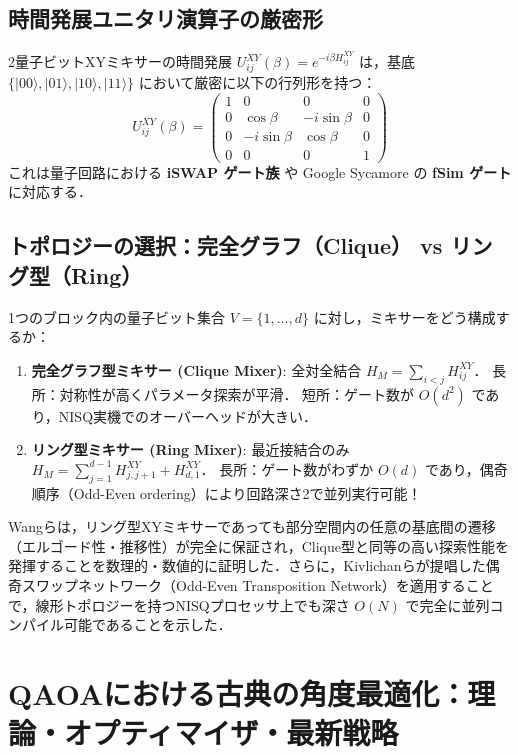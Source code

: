\documentclass[11pt,a4paper,oneside,openany]{ltjsbook}
\theoremstyle{definition}
\theoremstyle{plain}
\theoremstyle{remark}
\newcommand{\ket}[1]{|#1\rangle}
\begin{document}
\section{時間発展ユニタリ演算子の厳密形}
2量子ビットXYミキサーの時間発展 $U_{ij}^{XY}(\beta) = e^{-i \beta H_{ij}^{XY}}$ は，基底 $\{\ket{00}, \ket{01}, \ket{10}, \ket{11}\}$ において厳密に以下の行列形を持つ：
\begin{equation}
    U_{ij}^{XY}(\beta) = \begin{pmatrix}
        1 & 0 & 0 & 0 \\
        0 & \cos\beta & -i\sin\beta & 0 \\
        0 & -i\sin\beta & \cos\beta & 0 \\
        0 & 0 & 0 & 1
    \end{pmatrix}
\end{equation}
これは量子回路における \textbf{iSWAP ゲート族} や Google Sycamore の \textbf{fSim ゲート} に対応する．

\section{トポロジーの選択：完全グラフ（Clique） vs リング型（Ring）}
1つのブロック内の量子ビット集合 $V = \{1, \dots, d\}$ に対し，ミキサーをどう構成するか：
\begin{enumerate}
    \item \textbf{完全グラフ型ミキサー (Clique Mixer)}:
          全対全結合 $H_M = \sum_{i < j} H_{ij}^{XY}$．
          長所：対称性が高くパラメータ探索が平滑．
          短所：ゲート数が $O(d^2)$ であり，NISQ実機でのオーバーヘッドが大きい．
    \item \textbf{リング型ミキサー (Ring Mixer)}:
          最近接結合のみ $H_M = \sum_{j=1}^{d-1} H_{j, j+1}^{XY} + H_{d, 1}^{XY}$．
          長所：ゲート数がわずか $O(d)$ であり，偶奇順序（Odd-Even ordering）により回路深さ2で並列実行可能！
\end{enumerate}

Wangら\cite{wang2020xy}は，リング型XYミキサーであっても部分空間内の任意の基底間の遷移（エルゴード性・推移性）が完全に保証され，Clique型と同等の高い探索性能を発揮することを数理的・数値的に証明した．さらに，Kivlichanら\cite{kivlichan2018quantum}が提唱した偶奇スワップネットワーク（Odd-Even Transposition Network）を適用することで，線形トポロジーを持つNISQプロセッサ上でも深さ $O(N)$ で完全に並列コンパイル可能であることを示した．

\chapter{QAOAにおける古典の角度最適化：理論・オプティマイザ・最新戦略}
\label{sec:classical_optimization}
\end{document}
